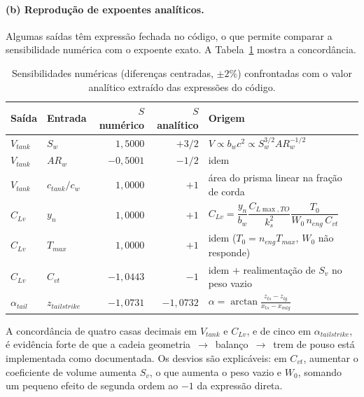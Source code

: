 \documentclass[11pt,a4paper]{article}
\begin{document}
\paragraph{(b) Reprodu\c{c}\~ao de expoentes anal\'iticos.}
Algumas sa\'idas t\^em express\~ao fechada no c\'odigo, o que permite comparar
a sensibilidade num\'erica com o expoente exato. A Tabela~\ref{tab:analitico}
mostra a concord\^ancia.

\begin{table}[H]
\centering
\caption{Sensibilidades num\'ericas (diferen\c{c}as centradas, $\pm 2\%$)
confrontadas com o valor anal\'itico extra\'ido das express\~oes do c\'odigo.}
\label{tab:analitico}
\small
\begin{tabular}{llrrl}
\toprule
Sa\'ida & Entrada & $S$ num\'erico & $S$ anal\'itico & Origem \\
\midrule
$V_{tank}$   & $S_w$            & $1{,}5000$  & $+3/2$   & $V \propto b_w c^2 \propto S_w^{3/2} AR_w^{-1/2}$ \\
$V_{tank}$   & $AR_w$           & $-0{,}5001$ & $-1/2$   & idem \\
$V_{tank}$   & $c_{tank}/c_w$   & $1{,}0000$  & $+1$     & \'area do prisma linear na fra\c{c}\~ao de corda \\
$C_{Lv}$     & $y_n$            & $1{,}0000$  & $+1$     & $C_{Lv} = \dfrac{y_n}{b_w}\dfrac{C_{L\max,TO}}{k_s^2}\dfrac{T_0}{W_0\,n_{eng}\,C_{vt}}$ \\
$C_{Lv}$     & $T_{max}$        & $1{,}0000$  & $+1$     & idem ($T_0 = n_{eng}T_{max}$, $W_0$ n\~ao responde) \\
$C_{Lv}$     & $C_{vt}$         & $-1{,}0443$ & $-1$     & idem $+$ realimenta\c{c}\~ao de $S_v$ no peso vazio \\
$\alpha_{tail}$ & $z_{tailstrike}$ & $-1{,}0731$ & $-1{,}0732$ &
  $\alpha = \arctan\!\frac{z_{ts}-z_{lg}}{x_{ts}-x_{mlg}}$ \\
\bottomrule
\end{tabular}
\end{table}

A concord\^ancia de quatro casas decimais em $V_{tank}$ e $C_{Lv}$, e de cinco
em $\alpha_{tailstrike}$, \'e evid\^encia forte de que a cadeia
geometria~$\to$~balan\c{c}o~$\to$~trem de pouso est\'a implementada como
documentada. Os desvios s\~ao explic\'aveis: em $C_{vt}$, aumentar o
coeficiente de volume aumenta $S_v$, o que aumenta o peso vazio e $W_0$,
somando um pequeno efeito de segunda ordem ao $-1$ da express\~ao direta.

\end{document}
